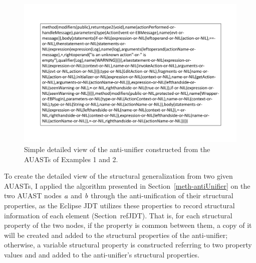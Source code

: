 
\begin{figure} [H]
  \centering\includegraphics [scale=0.5]{Drawing4/auMethod.pdf}
  \caption{Simple detailed view of the anti-unifier constructed from the AUASTs of Examples 1 and 2.}
  \label{fig:meth-anti-unifier}
\end{figure}


To create the detailed view of the structural generalization from two given AUASTs, I applied the  algorithm presented in Section~\ref{meth-antiUnifier} on the two AUAST nodes $\mathit{a}$ and $\mathit{b}$ through the anti-unification of their structural properties, as the Eclipse JDT utilizes these properties to record structural information of each  element (Section~ref{JDT}). That is, for each structural property of the two nodes, if the property is common between them, a copy of it will be created and added to the structural properties of the anti-unifier; otherwise, a variable structural property is constructed referring to two property values and and added to the anti-unifier's structural properties.






